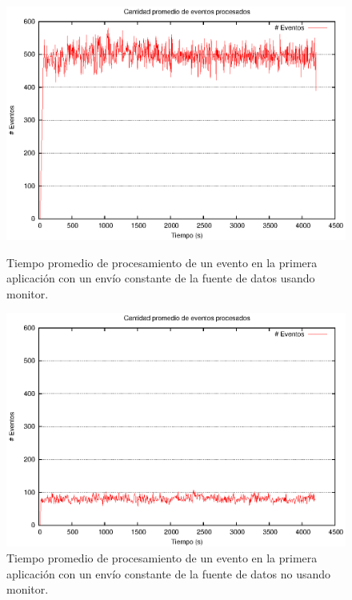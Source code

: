 \begin{figure}[ht]
\centering

\begin{minipage}[c]{0.45\textwidth}
\centering
    \includegraphics[width=\textwidth]{images/exp/app1/uniform/cm/avgEventProcess.eps}
    \caption{Tiempo promedio de procesamiento de un evento en la primera aplicación con un envío constante de la fuente de datos usando monitor.}
    \label{fig:app1-uniform-cm-avgEventProcess}
\end{minipage} \hspace*{1cm}
\begin{minipage}[c]{0.45\textwidth}
\centering
    \includegraphics[width=\textwidth]{images/exp/app1/uniform/sm/avgEventProcess.eps}
    \caption{Tiempo promedio de procesamiento de un evento en la primera aplicación con un envío constante de la fuente de datos no usando monitor.}
    \label{fig:app1-uniform-sm-avgEventProcess}
\end{minipage}

\end{figure}

